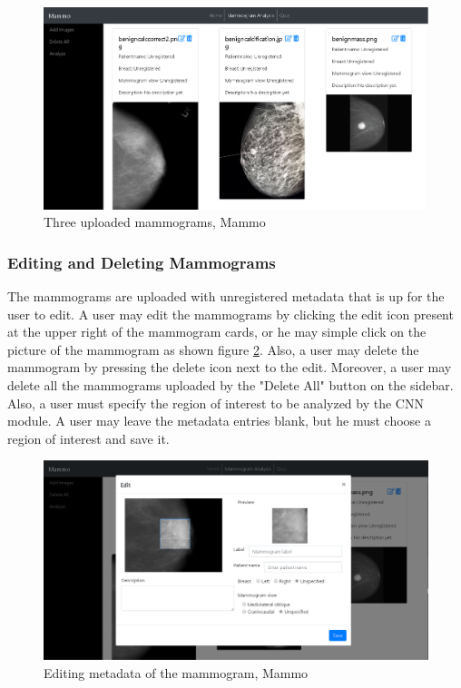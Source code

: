 \documentclass[11pt,a4paper,titlepage]{article}
\newcommand{\+}{\discretionary{\mbox{${\bm\cdot}\mkern-1mu$}}{}{}}
\begin{document}
	\begin{figure}[h]
		\centering
	  	\includegraphics[scale=0.5]{images/uploadMammograms.png}
		 \caption{Three uploaded mammograms, Mammo}
	  	\label{fig:uploadMammograms}
	\end{figure}
	
	\subsubsection{Editing and Deleting Mammograms}
		\qquad The mammograms are uploaded with unregistered metadata that is up for the user to edit. A user may edit the mammograms by clicking the edit icon present at the upper right of the mammogram cards, or he may simple click on the picture of the mammogram as shown figure \ref{fig:editMammograms}. Also, a user may delete the mammogram by pressing the delete icon next to the edit. Moreover, a user may delete all the mammograms uploaded by the "Delete All" button on the sidebar. Also, a user must specify the region of interest to be analyzed by the CNN module. A user may leave the metadata entries blank, but he must choose a region of interest and save it.
	
	\begin{figure}[h]
		\centering
	  	\includegraphics[scale=0.5]{images/editMammograms.png}
		 \caption{Editing metadata of the mammogram, Mammo}
	  	\label{fig:editMammograms}
	\end{figure}
	
\end{document}
